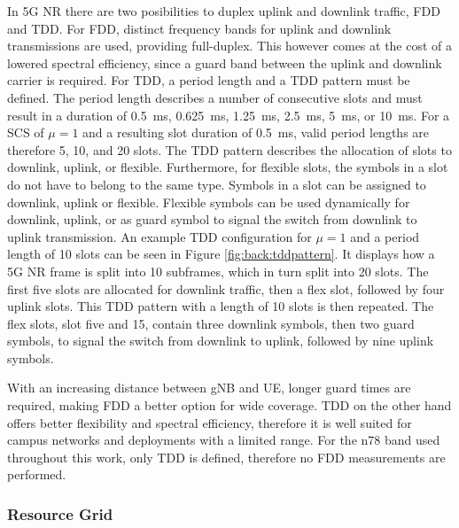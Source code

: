 In 5G \gls{NR} there are two posibilities to duplex uplink and downlink traffic, \gls{FDD} and \gls{TDD}.
For \gls{FDD}, distinct frequency bands for uplink and downlink transmissions are used, providing full-duplex.
This however comes at the cost of a lowered spectral efficiency, since a guard band between the uplink and
downlink carrier is required.
For \gls{TDD}, a period length and a \gls{TDD} pattern must be defined.
The period length describes a number of consecutive slots and must result in a duration of \SI{0.5}{\milli\second},
\SI{0.625}{\milli\second}, \SI{1.25}{\milli\second}, \SI{2.5}{\milli\second},
\SI{5}{\milli\second}, or \SI{10}{\milli\second}.
For a \gls{SCS} of $\mu = 1$ and a resulting slot duration of \SI{0.5}{\milli\second}, valid period lengths are
therefore 5, 10, and 20 slots.
The \gls{TDD} pattern describes the allocation of slots to downlink, uplink, or flexible.
Furthermore, for flexible slots, the symbols in a slot do not have to belong to the same type.
Symbols in a slot can be assigned to downlink, uplink or flexible.
Flexible symbols can be used dynamically for downlink, uplink, or as guard symbol to signal the switch from
downlink to uplink transmission.\cite{3gpp38.213,3gpp38.912}
An example \gls{TDD} configuration for $\mu = 1$ and a period length of 10 slots can be seen in Figure \ref{fig:back:tddpattern}.
It displays how a 5G \gls{NR} frame is split into 10 subframes, which in turn split into 20 slots.
The first five slots are allocated for downlink traffic, then a flex slot, followed by four uplink slots.
This \gls{TDD} pattern with a length of 10 slots is then repeated.
The flex slots, slot five and 15, contain three downlink symbols, then two guard symbols, to signal the switch from
downlink to uplink, followed by nine uplink symbols.

With an increasing distance between \gls{gNB} and \gls{UE}, longer guard times are required,
making \gls{FDD} a better option for wide coverage.\cite{berardinelli2016guardtimetdd}
\Gls{TDD} on the other hand offers better flexibility and spectral efficiency, therefore it is well suited
for campus networks and deployments with a limited range.
For the n78 band used throughout this work, only \gls{TDD} is defined, therefore no \gls{FDD} measurements are
performed.\cite[.p~44]{3gpp38.104}

\subsubsection{Resource Grid}\label{sec:back:resource}

